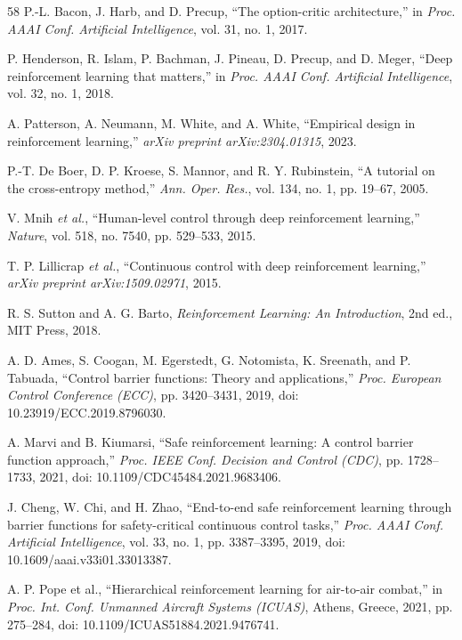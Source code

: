 \documentclass[conference]{IEEEtran}
\begin{document}
\begin{thebibliography}{58}
P.-L. Bacon, J. Harb, and D. Precup,
``The option-critic architecture,''
in \emph{Proc. AAAI Conf. Artificial Intelligence}, vol. 31, no. 1, 2017.

P. Henderson, R. Islam, P. Bachman, J. Pineau, D. Precup, and D. Meger,
``Deep reinforcement learning that matters,''
in \emph{Proc. AAAI Conf. Artificial Intelligence}, vol. 32, no. 1, 2018.

A. Patterson, A. Neumann, M. White, and A. White,
``Empirical design in reinforcement learning,''
\emph{arXiv preprint arXiv:2304.01315}, 2023.

P.-T. De Boer, D. P. Kroese, S. Mannor, and R. Y. Rubinstein,
``A tutorial on the cross-entropy method,''
\emph{Ann. Oper. Res.}, vol. 134, no. 1, pp. 19--67, 2005.

V. Mnih \emph{et al.},
``Human-level control through deep reinforcement learning,''
\emph{Nature}, vol. 518, no. 7540, pp. 529--533, 2015.

T. P. Lillicrap \emph{et al.},
``Continuous control with deep reinforcement learning,''
\emph{arXiv preprint arXiv:1509.02971}, 2015.

R. S. Sutton and A. G. Barto,
\emph{Reinforcement Learning: An Introduction}, 2nd ed., MIT Press, 2018.

A. D. Ames, S. Coogan, M. Egerstedt, G. Notomista, K. Sreenath, and P. Tabuada,
``Control barrier functions: Theory and applications,''
\emph{Proc. European Control Conference (ECC)}, pp. 3420--3431, 2019,
doi: 10.23919/ECC.2019.8796030.

A. Marvi and B. Kiumarsi,
``Safe reinforcement learning: A control barrier function approach,''
\emph{Proc. IEEE Conf. Decision and Control (CDC)}, pp. 1728--1733, 2021,
doi: 10.1109/CDC45484.2021.9683406.

J. Cheng, W. Chi, and H. Zhao,
``End-to-end safe reinforcement learning through barrier functions for safety-critical continuous control tasks,''
\emph{Proc. AAAI Conf. Artificial Intelligence}, vol. 33, no. 1, pp. 3387--3395, 2019,
doi: 10.1609/aaai.v33i01.33013387.

A. P. Pope et al.,
``Hierarchical reinforcement learning for air-to-air combat,''
in \emph{Proc. Int. Conf. Unmanned Aircraft Systems (ICUAS)}, Athens, Greece, 2021, pp. 275--284,
doi: 10.1109/ICUAS51884.2021.9476741.


\end{thebibliography}
\end{document}
